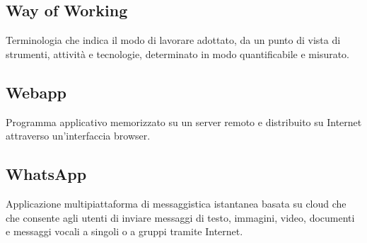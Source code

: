 \subsection{Way of Working}Terminologia che indica il modo di lavorare adottato, da un punto di vista di strumenti, attività e tecnologie, determinato in modo quantificabile e misurato.
\subsection{Webapp}Programma applicativo memorizzato su un server remoto e distribuito su Internet attraverso un'interfaccia browser.
\subsection{WhatsApp}Applicazione multipiattaforma di messaggistica istantanea basata su cloud che che consente agli utenti di inviare messaggi di testo, immagini, video, documenti e messaggi vocali a singoli o a gruppi tramite Internet.
